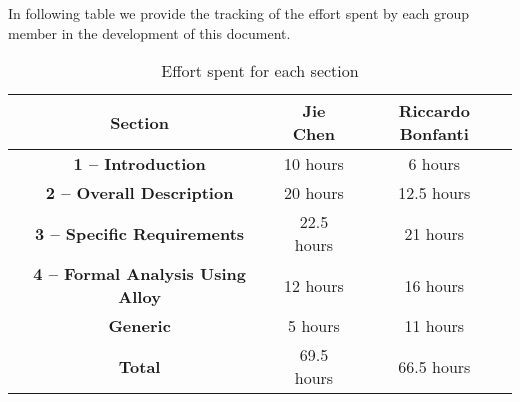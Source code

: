 In following table we provide the tracking of the effort spent by each group member in the development of this document.
\begin{table}[H]
    \centering
    \begin{tabular}{|c|c|c|}
    \hline
    \rowcolor{bluepoli!40}
    \textbf{Section} & \textbf{Jie Chen} & \textbf{Riccardo Bonfanti} \T\B \\
    \hline
     \textbf{1 – Introduction}                  & 10 hours & 6 hours \T\B \\
     \textbf{2 – Overall Description}           & 20 hours & 12.5 hours \T\B\\
     \textbf{3 – Specific Requirements}         & 22.5 hours & 21 hours \T\B\\
     \textbf{4 – Formal Analysis Using Alloy}   & 12 hours & 16 hours  \T\B \\
     \textbf{Generic}                           & 5 hours & 11 hours \T\B \\
     \hline
     \textbf{Total}                             & 69.5 hours & 66.5 hours \T\B \\

    \hline
    \end{tabular}
    \\[10pt]
    \caption{Effort spent for each section}\label{table:effort}
\end{table}